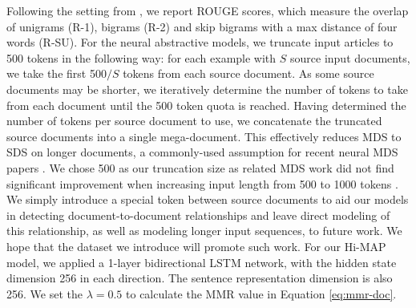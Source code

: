 \documentclass[11pt,a4paper]{article}
\begin{document}
Following the setting from \cite{lebanoff18mds}, we report ROUGE \cite{lin2004rouge} scores, which measure the overlap of unigrams (R-1), bigrams (R-2) and skip bigrams with a max distance of four words (R-SU).  For the neural abstractive models, we truncate input articles to 500 tokens in the following way: for each example with $S$ source input documents, we take the first 500$/S$ tokens from each source document.  As some source documents may be shorter, we iteratively determine the number of tokens to take from each document until the 500 token quota is reached. Having determined the number of tokens per source document to use, we concatenate the truncated source documents into a single mega-document. This effectively reduces MDS to SDS on longer documents, a commonly-used assumption for recent neural MDS papers \cite{17classification,liu18wikisum,lebanoff18mds}. We chose 500 as our truncation size as related MDS work did not find significant improvement when increasing input length from 500 to 1000 tokens \cite{liu18wikisum}. We simply introduce a special token between source documents to aid our models in detecting document-to-document relationships and leave direct modeling of this relationship, as well as modeling longer input sequences, to future work. We hope that the dataset we introduce will promote such work. For our Hi-MAP model, we applied a 1-layer bidirectional LSTM network, with the hidden state dimension 256 in each direction. The sentence representation dimension is also 256. We set the $\lambda=0.5$ to calculate the MMR value in Equation \ref{eq:mmr-doc}.
\end{document}
